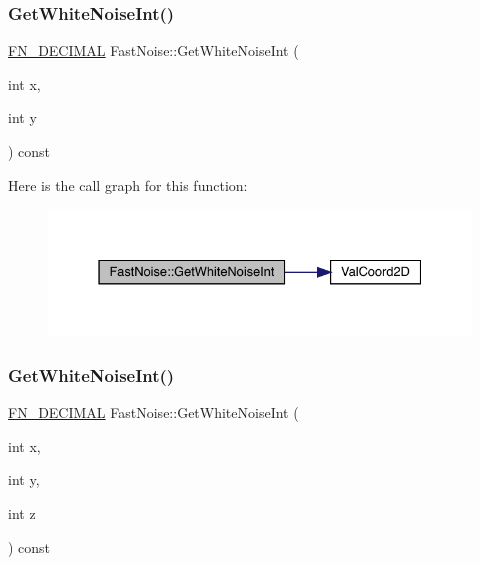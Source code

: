 \subsubsection{\texorpdfstring{Get\+White\+Noise\+Int()}{GetWhiteNoiseInt()}\hspace{0.1cm}{\footnotesize\ttfamily [1/3]}}
{\footnotesize\ttfamily \mbox{\hyperlink{_fast_noise_8h_a75a9ef6d2541c4921815b885bfd449c3}{F\+N\+\_\+\+D\+E\+C\+I\+M\+AL}} Fast\+Noise\+::\+Get\+White\+Noise\+Int (\begin{DoxyParamCaption}\item[{int}]{x,  }\item[{int}]{y }\end{DoxyParamCaption}) const}

Here is the call graph for this function\+:
\nopagebreak
\begin{figure}[H]
\begin{center}
\leavevmode
\includegraphics[width=331pt]{d1/dd8/class_fast_noise_a7a9d98438239800363188c7219bb26bc_cgraph}
\end{center}
\end{figure}
\mbox{\label{class_fast_noise_a1c0a782e7675a58f6fe777eb6fa06eaf}} 
\subsubsection{\texorpdfstring{Get\+White\+Noise\+Int()}{GetWhiteNoiseInt()}\hspace{0.1cm}{\footnotesize\ttfamily [2/3]}}
{\footnotesize\ttfamily \mbox{\hyperlink{_fast_noise_8h_a75a9ef6d2541c4921815b885bfd449c3}{F\+N\+\_\+\+D\+E\+C\+I\+M\+AL}} Fast\+Noise\+::\+Get\+White\+Noise\+Int (\begin{DoxyParamCaption}\item[{int}]{x,  }\item[{int}]{y,  }\item[{int}]{z }\end{DoxyParamCaption}) const}

